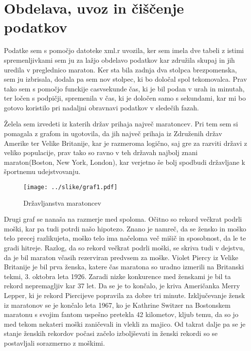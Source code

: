 \documentclass[11pt,a4paper]{article}
\begin{document}
\pagebreak
\section{Obdelava, uvoz in čiščenje podatkov}

Podatke sem s pomočjo datoteke xml.r uvozila, ker sem imela dve tabeli z istimi spremenljivkami sem ju za lažjo obdelavo podatkov kar združila skupaj in jih uredila v preglednico maraton. Ker sta bila zadnja dva stolpca brezpomenska, sem ju izbrisala, dodala pa sem nov stolpec, ki bo določal spol tekomovalca. Prav tako sem s pomočjo funckije casvsekunde čas, ki je bil podan v urah in minutah, ter ločen s podpičji, spremenila v čas, ki je določen samo s sekundami, kar mi bo gotovo koristilo pri nadaljni obravnavi podatkov v sledečih fazah.


Želela sem izvedeti iz katerih držav prihaja največ maratoncev. Pri tem sem si pomagala z grafom in ugotovila, da jih največ prihaja iz Združenih držav Amerike ter Velike Britanije, kar je razmeroma logično, saj gre za razviti državi z veliko populacije, prav tako so ravno v teh državah najbolj znani maraton(Boston, New York, London), kar verjetno še bolj spodbudi državljane k športnemu udejstvovanju.

\begin{figure}[H]
  \texttt{[image: ../slike/graf1.pdf]}
  \caption{Državljanstva maratoncev}
  \label{fig:Slika 1}
\end{figure}

\newpage
Drugi graf se nanaša na razmerje med spoloma. Očitno so rekord večkrat podrli moški, kar pa tudi potrdi našo hipotezo. Znano je namreč, da se žensko in moško telo precej razlikujeta, moško telo ima načeloma več mišič in sposobnost, da le te gradi hitreje.
Razlog, da so rekord večkrat podrli moški, se skriva tudi v dejstvu, da je bil maraton včasih rezerviran predvsem za moške. Violet Piercy iz Velike Britanije je bil prva ženska, katere čas maratona so uradno izmerili na Britanski tekmi, 3. oktobra leta 1926. Zaradi nizke konkurence med ženskami je bil ta rekord nepremagljiv kar 37 let. Da se je to končalo, je kriva Američanka Merry Lepper, ki je rekord Piercijeve popravila za dobre tri minute.
Izključevanje žensk iz maratonov se je končalo leta 1967, ko je Kathrine Switzer na Bostonskem maratonu s svojim fantom uspešno pretekla 42 kilometov, kljub temu, da so jo med tekom nekateri moški zaničevali in vlekli za majico. Od takrat dalje pa se je stanje ženskih rekordov počasi začelo izboljševati in ženski rekordi so se postavljali sorazmerno z moškimi.
\end{document}
